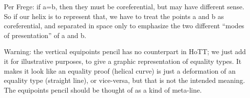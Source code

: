 \documentclass{article}
\begin{document}
Per Frege: if a=b, then they must be coreferential, but may have
different sense. So if our helix is to represent that, we have to
treat the points a and b as coreferential, and separated in space only
to emphasize the two different ``modes of presentation'' of a and b.

Warning: the vertical equipoints pencil has no counterpart in HoTT; we
just add it for illustrative purposes, to give a graphic
representation of equality types. It makes it look like an equality
proof (helical curve) is just a deformation of an equality type
(straight line), or vice-versa, but that is not the intended meaning.
The equipoints pencil should be thought of as a kind of meta-line.

\begin{figure}[h]
\centering
{}
\end{figure}
\end{document}
